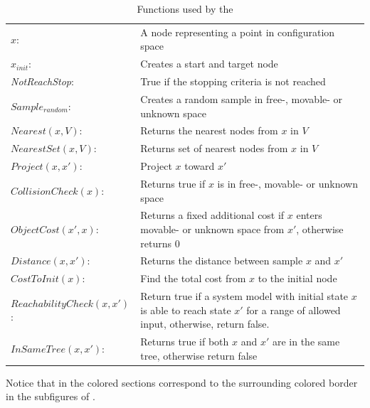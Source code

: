 \noindent
\begin{table}[H]
  \centering
  \begin{tabular}%
  {>{\raggedright\arraybackslash}p{}%
   >{\raggedright\arraybackslash}p{}}
  $x$:& A node representing a point in configuration space\\
  $x_{init}$:& Creates a start and target node\\ 
  \textit{NotReachStop}:& True if the stopping criteria is not reached\\ 
  $\mathit{Sample_{random}}$:& Creates a random sample in free-, movable- or unknown space\\
  $\mathit{Nearest}(x, V)$:& Returns the nearest nodes from $x$ in $V$\\
  $\mathit{NearestSet}(x, V)$:& Returns set of nearest nodes from $x$ in $V$\\
  $\mathit{Project}(x, x')$:& Project $x$ toward $x'$\\
  $\mathit{CollisionCheck}(x)$:& Returns true if $x$ is in free-, movable- or unknown space\\
  $\mathit{ObjectCost}(x', x)$:& Returns a fixed additional cost if $x$ enters movable- or unknown space from $x'$, otherwise returns 0\\
  $\mathit{Distance}(x, x')$:& Returns the distance between sample $x$ and $x'$\\
  $\mathit{CostToInit}(x)$:& Find the total cost from $x$ to the initial node\\
    $\mathit{ReachabilityCheck}(x, x')$:& Return true if a system model with initial state $x$ is able to reach state $x'$ for a range of allowed input, otherwise, return false.\\
    $\mathit{InSameTree}(x, x')$:& Returns true if both $x$ and $x'$ are in the same tree, otherwise return false\\
  \end{tabular}
\caption{Functions used by the }
\label{table:functions_for_proposed_rrt_star}
\end{table}

Notice that in  the colored sections correspond to the surrounding colored border in the subfigures of .\bs

